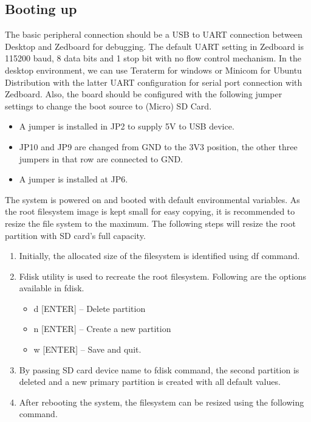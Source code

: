 \subsection{Booting up}
The basic peripheral connection should be a USB to UART connection between Desktop and Zedboard for debugging. The default UART setting in Zedboard is 115200 baud, 8 data bits and 1 stop bit with no flow control mechanism.  In the desktop environment, we can use Teraterm for windows or Minicom for Ubuntu Distribution with the latter UART configuration for serial port connection with Zedboard. Also, the board should be configured with the following jumper settings to change the boot source to (Micro) SD Card.
\begin{itemize}\itemsep0em 
	\item A jumper is installed in JP2 to supply 5V to USB device.
	\item JP10 and JP9 are changed from GND to the 3V3 position, the other three jumpers in that row are connected to GND.
	\item A jumper is installed at JP6.
\end{itemize}

The system is powered on and booted with default environmental variables. As the root filesystem image is kept small for easy copying, it is recommended to resize the file system to the maximum. The following steps will resize the root partition with SD card’s full capacity.
\begin{enumerate}\itemsep0em 
	\item Initially, the allocated size of the filesystem is identified using df command.
	
	\item Fdisk utility is used to recreate the root filesystem. Following are the options available in fdisk.
	\begin{itemize}\itemsep0em 
	\item d [ENTER] -- Delete partition
	\item n [ENTER] -- Create a new partition
	\item w [ENTER] -- Save and quit.
	\end{itemize}
	\item By passing SD card device name to fdisk command, the second partition is deleted and a new primary partition is created with all default values. 
	
	\item After rebooting the system, the filesystem can be resized using the following command.
	
\end{enumerate}